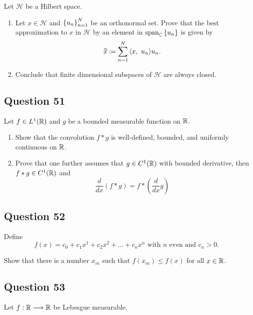 \documentclass[12pt]{article}
\providecommand{\tightlist}{%
  \setlength{\itemsep}{0pt}\setlength{\parskip}{0pt}}
\begin{document}
Let \(\mathcal H\) be a Hilbert space.

\begin{enumerate}
\def\labelenumi{\arabic{enumi}.}
\tightlist
\item
  Let \(x\in \mathcal H\) and \(\left\{{u_n}\right\}_{n=1}^N\) be an orthonormal
  set. Prove that the best approximation to \(x\) in \(\mathcal H\) by
  an element in \({\mathrm{span}}_{\mathbb{C}}\left\{{u_n}\right\}\) is given by \[
    \widehat{x} \coloneqq \sum_{n=1}^N {\left\langle {x},~{u_n} \right\rangle}u_n.
    \]
\item
  Conclude that finite dimensional subspaces of \(\mathcal H\) are
  always closed.
\end{enumerate}

\hypertarget{question-51-1}{%
\subsection{Question 51}\label{question-51-1}}

Let \(f \in L^1({\mathbb{R}})\) and \(g\) be a bounded measurable function on
\({\mathbb{R}}\).

\begin{enumerate}
\def\labelenumi{\arabic{enumi}.}
\tightlist
\item
  Show that the convolution \(f\ast g\) is well-defined, bounded, and
  uniformly continuous on \({\mathbb{R}}\).
\item
  Prove that one further assumes that \(g \in C^1({\mathbb{R}})\) with bounded
  derivative, then \(f\ast g \in C^1({\mathbb{R}})\) and \[
  \frac{d}{d x}(f * g)=f *\left(\frac{d}{d x} g\right)
  \]
\end{enumerate}

\hypertarget{question-52-1}{%
\subsection{Question 52}\label{question-52-1}}

Define \[
f(x)=c_{0}+c_{1} x^{1}+c_{2} x^{2}+\ldots+c_{n} x^{n} \text { with } n \text { even and } c_{n}>0.
\]

Show that there is a number \(x_m\) such that \(f(x_m) \leq f(x)\) for
all \(x\in {\mathbb{R}}\).

\hypertarget{question-53-1}{%
\subsection{Question 53}\label{question-53-1}}

Let \(f: {\mathbb{R}} \longrightarrow {\mathbb{R}}\) be Lebesgue measurable.
\end{document}
